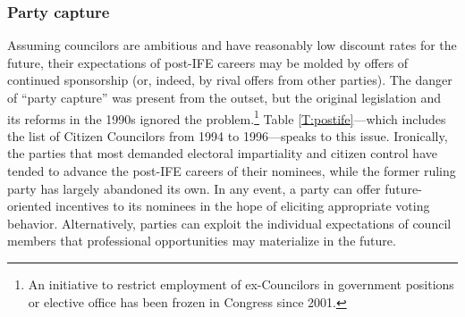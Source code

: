 \documentclass[12 pt, letter]{article}
\begin{document}
\subsubsection{Party capture}
Assuming councilors are ambitious and have reasonably low discount
rates for the future, their expectations of post-IFE careers may be
molded by offers of continued sponsorship (or, indeed, by rival
offers from other parties).  The danger of ``party capture'' was
present from the outset, but the original legislation and its
reforms in the 1990s ignored the problem.\footnote{An initiative to
restrict employment of ex-Councilors in government positions or
elective office has been frozen in Congress since 2001.}  Table
\ref{T:postife}---which includes the list of Citizen Councilors from
1994 to 1996---speaks to this issue.  Ironically, the parties that
most demanded electoral impartiality and citizen control have tended
to advance the post-IFE careers of their nominees, while the former
ruling party has largely abandoned its own.  In any event, a party
can offer future-oriented incentives to its nominees in the hope of
eliciting appropriate voting behavior.  Alternatively, parties can
exploit the individual expectations of council members that
professional opportunities may materialize in the future.
\end{document}
